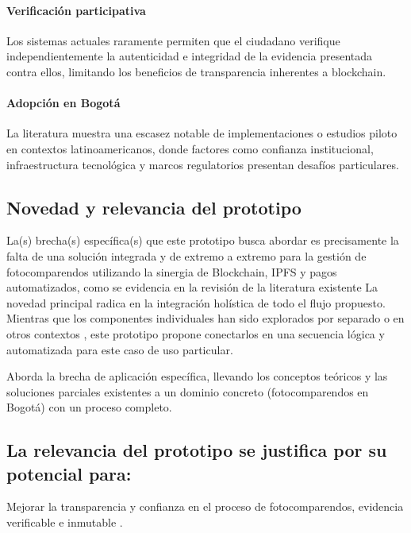 \paragraph{Verificación participativa}
Los sistemas actuales raramente permiten que el ciudadano verifique independientemente la autenticidad e integridad de la evidencia presentada contra ellos, limitando los beneficios de transparencia inherentes a blockchain. 

\paragraph{Adopción en Bogotá}
 La literatura muestra una escasez notable de implementaciones o estudios piloto en contextos latinoamericanos, donde factores como confianza institucional, infraestructura tecnológica y marcos regulatorios presentan desafíos particulares. \parencite{choquevilca2024blockchain, rezabala2025blockchain}

\subsection{Novedad y relevancia del prototipo} 
La(s) brecha(s) específica(s) que este prototipo busca abordar es precisamente la falta de una solución integrada y de extremo a extremo para la gestión de fotocomparendos utilizando la sinergia de Blockchain, IPFS y pagos automatizados, como se evidencia en la revisión de la literatura existente \parencite{yousfi2022its,AnandSingh_ProjectReport_Year}
La novedad principal radica en la integración holística de todo el flujo propuesto. Mientras que los componentes individuales han sido explorados por separado \parencite{adel2023decentralized,mishra2024integration} o en otros contextos \parencite{mani2023smart,dutta2023solution}, este prototipo propone conectarlos en una secuencia lógica y automatizada para este caso de uso particular. 

Aborda la brecha de aplicación específica, llevando los conceptos teóricos \parencite{swan2015blockchain, antonopoulos2023mastering} y las soluciones parciales existentes \parencite{choquevilca2024blockchain} a un dominio concreto (fotocomparendos en Bogotá) con un proceso completo. 

\subsection{La relevancia del prototipo se justifica por su potencial para:} 
Mejorar la transparencia y confianza en el proceso de fotocomparendos, evidencia verificable e inmutable \parencite{meroni2023editorial,thanasas2025enhancing}. 

